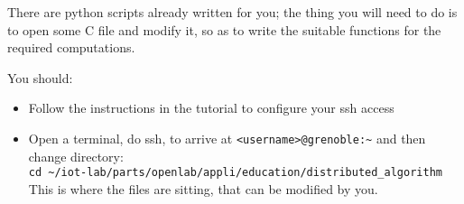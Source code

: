 \documentclass{article}
\begin{document}
There are python scripts already written for you; the thing you will need to do is to open some C file and modify it, so as to write the suitable functions for the required computations.

You should:
\begin{itemize}
\item Follow the instructions in the tutorial to configure your ssh access
\item Open a  terminal,  do ssh, to arrive at \verb=<username>@grenoble:~= and then change directory:\\
\verb=cd ~/iot-lab/parts/openlab/appli/education/distributed_algorithm= \\
This is where the files are sitting, that can be modified by you.\\


\end{itemize}
\end{document}
